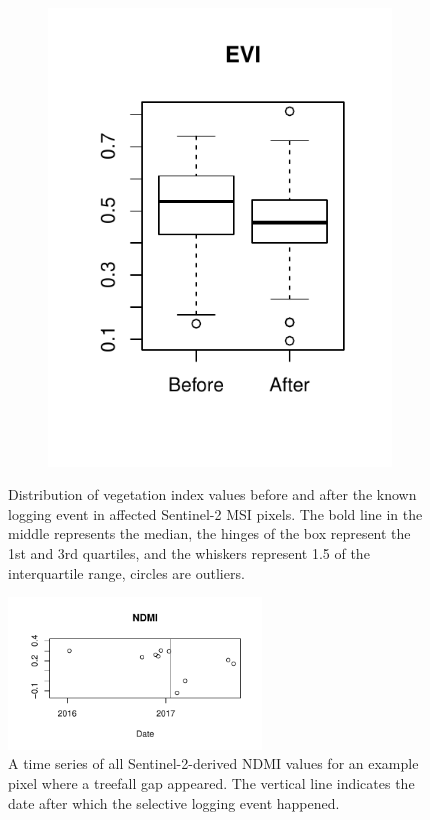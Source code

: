 \documentclass[a4paper,12pt]{scrbook}
\begin{document}
\begin{figure}
\begin{subfigure}[b]{0.32\textwidth}
    \includegraphics[width=\textwidth]{thesis-figures/07-boxplot-evi}
  \end{subfigure}
  \caption{Distribution of vegetation index values before and after the known logging event in affected Sentinel-2 \ac{MSI} pixels. The bold line in the middle represents the median, the hinges of the box represent the 1st and 3rd quartiles, and the whiskers represent 1.5 of the interquartile range, circles are outliers.}
  \label{fig-boxplots}
\end{figure}

\begin{figure}
  \centering
  \includegraphics[width=0.6\textwidth]{thesis-figures/08-guyana-ts-ndmi}
  \caption{A time series of all Sentinel-2-derived \ac{NDMI} values for an example pixel where a treefall gap appeared. The vertical line indicates the date after which the selective logging event happened.}
  \label{fig-guyana-ts-ndmi}
\end{figure}
\end{document}
